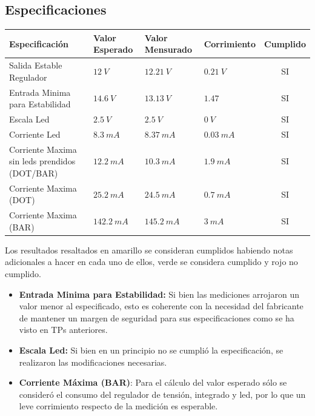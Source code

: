 \documentclass[12pt,a4paper]{article}
\begin{document}
		\subsection{Especificaciones}
			\begin{center}
			
			{\footnotesize \begin{tabular}{ |l|l|l|l|c| }

			\hline
			Especificación & Valor Esperado & Valor Mensurado & Corrimiento & Cumplido \\ \hline
			Salida Estable Regulador & $12 \: V$ & $12.21 \: V$ & $0.21 \: V$ &  \cellcolor{green!100} SI \\ \hline
			Entrada Minima para Estabilidad & $ 14.6 \: V$ & $13.13 \:V$ & $1.47 \:$ & \cellcolor{green!100} SI \\ \hline
			Escala Led & $2.5 \:V$ & $2.5 \: V$ & $0 \:V$ &\cellcolor{yellow!100} SI \\ \hline
			Corriente Led & $8.3 \: mA$ & $8.37 \: mA$ & $0.03 \: mA$ & \cellcolor{green!100} SI \\ \hline
			Corriente Maxima sin leds prendidos (DOT/BAR) & $12.2 \: mA$ & $10.3 \: mA$ & $1.9 \: mA$ & \cellcolor{green!100} SI \\ \hline
			Corriente Maxima (DOT) & $25.2 \: mA$ & $24.5 \: mA$ & $0.7 \: mA$ & \cellcolor{green!100} SI \\ \hline
			Corriente Maxima (BAR) & $142.2 \: mA$ & $145.2 \: mA$ & $3 \: mA$ & \cellcolor{yellow!100} SI \\ \hline
							
				
			\end{tabular}}\label{tab:specs}
			\end{center}

		Los resultados resaltados en amarillo se consideran cumplidos habiendo notas adicionales a hacer en cada uno de ellos, verde se considera cumplido y rojo no cumplido. 
		\begin{itemize}
			\item \textbf{Entrada Minima para Estabilidad:} Si bien las mediciones arrojaron un valor menor al especificado, esto es coherente con la necesidad del fabricante de mantener un margen de seguridad para sus especificaciones como se ha visto en TPs anteriores.
			\item \textbf{Escala Led:} Si bien en un principio no se cumplió la especificación, se realizaron las modificaciones necesarias.
			\item \textbf{Corriente Máxima (BAR)}: Para el cálculo del valor esperado sólo se consideró el consumo del regulador de tensión, integrado y led, por lo que un leve corrimiento respecto de la medición es esperable. 
		\end{itemize}
\end{document}
